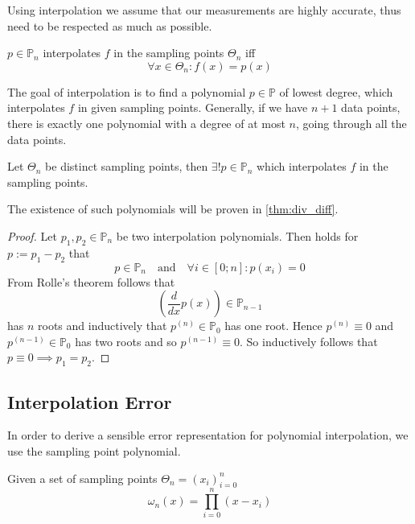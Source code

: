 Using interpolation we assume that our measurements are highly accurate, thus need to be respected as much as possible.
\begin{definition}
   \(p \in \mathbb{P}_n\) interpolates \(f\) in the sampling points \(\Theta_n\) iff
   \[\forall x \in \Theta_n: f(x) = p(x)\]
\end{definition}

The goal of interpolation is to find a polynomial \(p \in \mathbb{P}\) of lowest degree, which interpolates \(f\) in given sampling points.
Generally, if we have \(n+1\) data points, there is exactly one polynomial with a degree of at most \(n\), going through all the data points.
\begin{theorem}
   Let \(\Theta_n\) be distinct sampling points, then \(\exists! p \in \mathbb{P}_n\) which interpolates \(f\) in the sampling points.
\end{theorem}
\begin{remark}
   The existence of such polynomials will be proven in \cref{thm:div_diff}.
\end{remark}
\begin{proof}
   Let \(p_1, p_2 \in \mathbb{P}_n\) be two interpolation polynomials.
   Then holds for \(p := p_1 - p_2\) that
   \[p \in \mathbb{P}_n \quad\text{and}\quad \forall i \in [0;n]: p(x_i) = 0\]
   From Rolle's theorem follows that
   \[\left(\frac{d}{dx} p(x)\right) \in \mathbb{P}_{n-1}\]
   has \(n\) roots and inductively that \(p^{(n)} \in \mathbb{P}_0\) has one root.
   Hence \(p^{(n)} \equiv 0\) and \(p^{(n-1)} \in \mathbb{P}_0\) has two roots and so \(p^{(n-1)} \equiv 0\).
   So inductively follows that \(p \equiv 0 \implies p_1 = p_2\).
\end{proof}

\subsection{Interpolation Error}
In order to derive a sensible error representation for polynomial interpolation, we use the sampling point polynomial.
\begin{definition}\label{def:sampl_point_poly}
   Given a set of sampling points \(\Theta_n = (x_i)_{i=0}^n\)
   \[\omega_{n}(x) = \prod_{i = 0}^{n} (x - x_i)\]
\end{definition}


